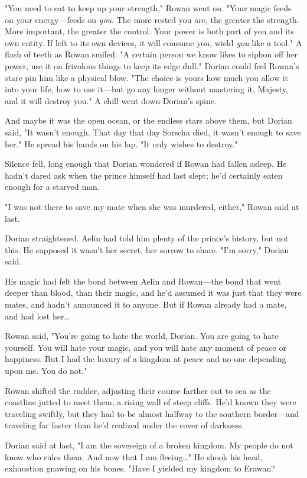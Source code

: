 "You need to eat to keep up your strength," Rowan went on. "Your magic feeds on your energy---feeds on \emph{you}. The more rested you are, the greater the strength. More important, the greater the control. Your power is both part of you and its own entity. If left to its own devices, it will consume you, wield \emph{you} like a tool." A flash of teeth as Rowan smiled. "A certain person we know likes to siphon off her power, use it on frivolous things to keep its edge dull." Dorian could feel Rowan's stare pin him like a physical blow. "The choice is yours how much you allow it into your life, how to use it---but go any longer without mastering it, Majesty, and it will destroy you." A chill went down Dorian's spine.

And maybe it was the open ocean, or the endless stars above them, but Dorian said, "It wasn't enough. That day  that day Sorscha died, it wasn't enough to save her." He spread his hands on his lap. "It only wishes to destroy."

Silence fell, long enough that Dorian wondered if Rowan had fallen asleep. He hadn't dared ask when the prince himself had last slept; he'd certainly eaten enough for a starved man.

"I was not there to save my mate when she was murdered, either," Rowan said at last.

Dorian straightened. Aelin had told him plenty of the prince's history, but not this. He supposed it wasn't her secret, her sorrow to share. "I'm sorry," Dorian said.

His magic had felt the bond between Aelin and Rowan---the bond that went deeper than blood, than their magic, and he'd assumed it was just that they were mates, and hadn't announced it to anyone. But if Rowan already had a mate, and had lost her\ldots{}

Rowan said, "You're going to hate the world, Dorian. You are going to hate yourself. You will hate your magic, and you will hate any moment of peace or happiness. But I had the luxury of a kingdom at peace and no one depending upon me. You do not."

Rowan shifted the rudder, adjusting their course farther out to sea as the coastline jutted to meet them, a rising wall of steep cliffs. He'd known they were traveling swiftly, but they had to be almost halfway to the southern border---and traveling far faster than he'd realized under the cover of darkness.

Dorian said at last, "I am the sovereign of a broken kingdom. My people do not know who rules them. And now that I am fleeing\ldots" He shook his head, exhaustion gnawing on his bones. "Have I yielded my kingdom to Erawan?

